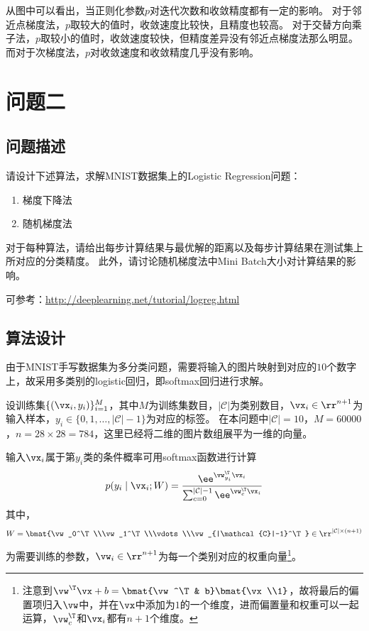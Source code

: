 \documentclass[logo,reportComp]{thesis}
\begin{document}
从图中可以看出，当正则化参数$p$对迭代次数和收敛精度都有一定的影响。
对于邻近点梯度法，$p$取较大的值时，收敛速度比较快，且精度也较高。
对于交替方向乘子法，$p$取较小的值时，收敛速度较快，但精度差异没有邻近点梯度法那么明显。
而对于次梯度法，$p$对收敛速度和收敛精度几乎没有影响。

\section{问题二}
\subsection{问题描述}
请设计下述算法，求解MNIST数据集上的Logistic Regression问题：
\begin{enumerate}
    \item 梯度下降法
    \item 随机梯度法
\end{enumerate}

对于每种算法，请给出每步计算结果与最优解的距离以及每步计算结果在测试集上所对应的分类精度。
此外，请讨论随机梯度法中Mini Batch大小对计算结果的影响。

可参考：\url{http://deeplearning.net/tutorial/logreg.html}


\subsection{算法设计}
由于MNIST手写数据集为多分类问题，需要将输入的图片映射到对应的$10$个数字上，故采用多类别的logistic回归，即softmax回归进行求解。

设训练集$\{(\vx_i,y_i)\}_{i=1}^M$，其中$M$为训练集数目，${|\mathcal{C}|}$为类别数目，$\vx_i\in\rr^{n+1}$为输入样本，$y_i\in\{0,1,\ldots,|\mathcal{C}|-1\}$为对应的标签。
在本问题中${|\mathcal{C}|}=10$，$M=60000$，$n=28\times 28=784$，这里已经将二维的图片数组展平为一维的向量。

输入$\vx_i$属于第$y_i$类的条件概率可用softmax函数进行计算
\begin{equation}
p(y_i\mid \vx_i;W)=\frac{\ee^{\vw_{y_i}^\T\vx_i}}{\sum_{c=0}^{|\mathcal{C}|-1}\ee^{\vw_c^\T\vx_i}}
\end{equation}
其中，
\[W=\bmat{\vw_0^\T\\\vw_1^\T\\\vdots\\\vw_{|\mathcal{C}|-1}^\T}\in\rr^{{|\mathcal{C}|}\times (n+1)}\]
为需要训练的参数，$\vw_i\in\rr^{n+1}$为每一个类别对应的权重向量\footnote{注意到$\vw^\T\vx+b=\bmat{\vw^\T & b}\bmat{\vx\\1}$，故将最后的偏置项归入$\vw$中，并在$\vx$中添加为$1$的一个维度，进而偏置量和权重可以一起运算，$\vw_c^\T$和$\vx_i$都有$n+1$个维度。}。
\end{document}
